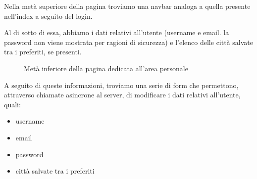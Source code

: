 Nella metà superiore della pagina troviamo una navbar analoga a quella presente nell'index a seguito del login.

\vspace{5mm}

Al di sotto di essa, abbiamo i dati relativi all'utente (username e email. la password non viene mostrata per ragioni di 
sicurezza) e l'elenco delle città salvate tra i preferiti, se presenti.

\begin{figure}[ht]
    \centering
    \caption{Metà inferiore della pagina dedicata all'area personale}
\end{figure}

A seguito di queste informazioni, troviamo una serie di form che permettono, attraverso chiamate asincrone al server, di modificare 
i dati relativi all'utente, quali:
\begin{itemize}
    \item username
    \item email
    \item password 
    \item città salvate tra i preferiti
\end{itemize}